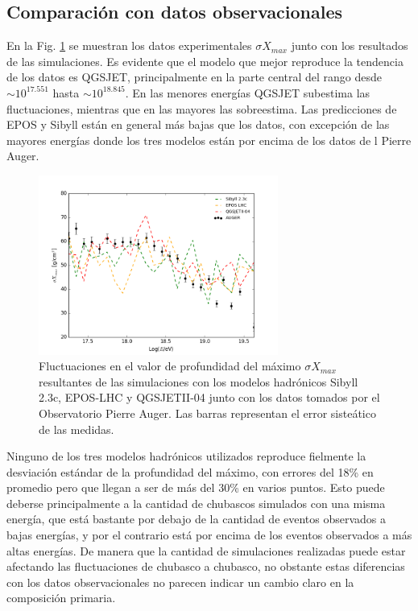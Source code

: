 \subsection{Comparación con datos observacionales}
En la Fig. \ref{fig:Sobs} se muestran los datos experimentales $\sigma X_{max}$ junto con los resultados de las simulaciones. Es evidente que el modelo que mejor reproduce la tendencia de los datos es QGSJET, principalmente en la parte central del rango desde $\sim 10^{17.551}$ hasta $\sim 10^{18.845}$. En las menores energías QGSJET subestima las fluctuaciones, mientras que en las mayores las sobreestima. Las predicciones de EPOS y Sibyll están en general más bajas que los datos, con excepción de las mayores energías donde los tres modelos están por encima de los datos de l Pierre Auger.\\

\begin{figure}[h]
\centering
\includegraphics[width=0.7\textwidth]{Figuras/StddvXmax_modelos_obs} 
\caption{Fluctuaciones en el valor de profundidad del máximo $\sigma X_{max}$ resultantes de las simulaciones con los modelos hadrónicos Sibyll 2.3c, EPOS-LHC y QGSJETII-04 junto con los datos tomados por el Observatorio Pierre Auger. Las barras representan el error sisteático de las medidas.}
\label{fig:Sobs}
\end{figure}	

Ninguno de los tres modelos hadrónicos utilizados reproduce fielmente la desviación estándar de la profundidad del máximo, con errores del 18\% en promedio pero que llegan a ser de más del 30\% en varios puntos. Esto puede deberse principalmente a la cantidad de chubascos simulados con una misma energía, que está bastante por debajo de la cantidad de eventos observados a bajas energías, y por el contrario está por encima de los eventos observados a más altas energías. De manera que la cantidad de simulaciones realizadas puede estar afectando las fluctuaciones de chubasco a chubasco, no obstante estas diferencias con los datos observacionales no parecen indicar un cambio claro en la composición primaria.


